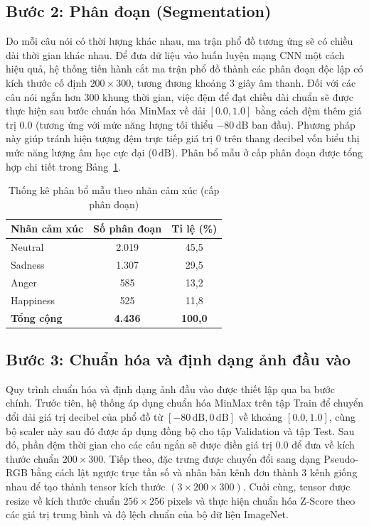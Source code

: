 \subsection{Bước 2: Phân đoạn (Segmentation)}

Do mỗi câu nói có thời lượng khác nhau, ma trận phổ đồ tương ứng sẽ có chiều dài thời gian khác nhau. Để đưa dữ liệu vào huấn luyện mạng CNN một cách hiệu quả, hệ thống tiến hành cắt ma trận phổ đồ thành các phân đoạn độc lập có kích thước cố định $200 \times 300$, tương đương khoảng 3 giây âm thanh. Đối với các câu nói ngắn hơn 300 khung thời gian, việc đệm để đạt chiều dài chuẩn sẽ được thực hiện sau bước chuẩn hóa MinMax về dải $[0.0, 1.0]$ bằng cách đệm thêm giá trị $0.0$ (tương ứng với mức năng lượng tối thiểu $-80\,\text{dB}$ ban đầu). Phương pháp này giúp tránh hiện tượng đệm trực tiếp giá trị $0$ trên thang decibel vốn biểu thị mức năng lượng âm học cực đại ($0\,\text{dB}$). Phân bổ mẫu ở cấp phân đoạn được tổng hợp chi tiết trong Bảng~\ref{tab:segment_distribution}.

\begin{table}[H]
\centering
\caption{Thống kê phân bổ mẫu theo nhãn cảm xúc (cấp phân đoạn)}
\label{tab:segment_distribution}
\begin{tabular}{lcc}
\toprule
\textbf{Nhãn cảm xúc} & \textbf{Số phân đoạn} & \textbf{Tỉ lệ (\%)} \\
\midrule
Neutral & 2.019 & 45,5 \\
Sadness & 1.307 & 29,5 \\
Anger & 585 & 13,2 \\
Happiness & 525 & 11,8 \\
\midrule
\textbf{Tổng cộng} & \textbf{4.436} & \textbf{100,0} \\
\bottomrule
\end{tabular}
\end{table}

\subsection{Bước 3: Chuẩn hóa và định dạng ảnh đầu vào}

Quy trình chuẩn hóa và định dạng ảnh đầu vào được thiết lập qua ba bước chính. Trước tiên, hệ thống áp dụng chuẩn hóa MinMax trên tập Train để chuyển đổi dải giá trị decibel của phổ đồ từ $[-80\,\text{dB}, 0\,\text{dB}]$ về khoảng $[0.0, 1.0]$, cùng bộ scaler này sau đó được áp dụng đồng bộ cho tập Validation và tập Test. Sau đó, phần đệm thời gian cho các câu ngắn sẽ được điền giá trị $0.0$ để đưa về kích thước chuẩn $200 \times 300$. Tiếp theo, đặc trưng được chuyển đổi sang dạng Pseudo-RGB bằng cách lật ngược trục tần số và nhân bản kênh đơn thành 3 kênh giống nhau để tạo thành tensor kích thước $(3 \times 200 \times 300)$. Cuối cùng, tensor được resize về kích thước chuẩn $256 \times 256$ pixels và thực hiện chuẩn hóa Z-Score theo các giá trị trung bình và độ lệch chuẩn của bộ dữ liệu ImageNet. 

